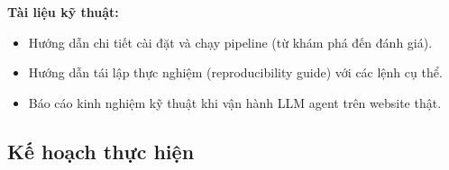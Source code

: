 \documentclass[14pt]{article}
\begin{document}
\textbf{Tài liệu kỹ thuật:}
\begin{itemize}[leftmargin=1.5cm, label=\textbullet]
    \item Hướng dẫn chi tiết cài đặt và chạy pipeline (từ khám phá đến đánh giá).
    \item Hướng dẫn tái lập thực nghiệm (reproducibility guide) với các lệnh cụ thể.
    \item Báo cáo kinh nghiệm kỹ thuật khi vận hành LLM agent trên website thật.
\end{itemize}

\subsection{Kế hoạch thực hiện}
\end{document}
